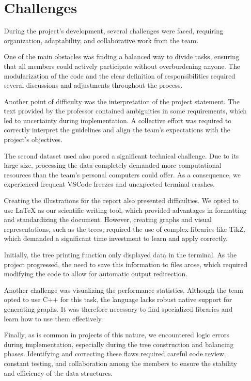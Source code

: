 \section{Challenges}

During the project's development, several challenges were faced, requiring organization, adaptability, and collaborative work from the team.

One of the main obstacles was finding a balanced way to divide tasks, ensuring that all members could actively participate without overburdening anyone. The modularization of the code and the clear definition of responsibilities required several discussions and adjustments throughout the process.

Another point of difficulty was the interpretation of the project statement. The text provided by the professor contained ambiguities in some requirements, which led to uncertainty during implementation. A collective effort was required to correctly interpret the guidelines and align the team's expectations with the project's objectives.

The second dataset used also posed a significant technical challenge. Due to its large size, processing the data completely demanded more computational resources than the team's personal computers could offer. As a consequence, we experienced frequent VSCode freezes and unexpected terminal crashes.

Creating the illustrations for the report also presented difficulties. We opted to use LaTeX as our scientific writing tool, which provided advantages in formatting and standardizing the document. However, creating graphs and visual representations, such as the trees, required the use of complex libraries like TikZ, which demanded a significant time investment to learn and apply correctly.

Initially, the tree printing function only displayed data in the terminal. As the project progressed, the need to save this information to files arose, which required modifying the code to allow for automatic output redirection.

Another challenge was visualizing the performance statistics. Although the team opted to use C++ for this task, the language lacks robust native support for generating graphs. It was therefore necessary to find specialized libraries and learn how to use them effectively.

Finally, as is common in projects of this nature, we encountered logic errors during implementation, especially during the tree construction and balancing phases. Identifying and correcting these flaws required careful code review, constant testing, and collaboration among the members to ensure the stability and efficiency of the data structures.